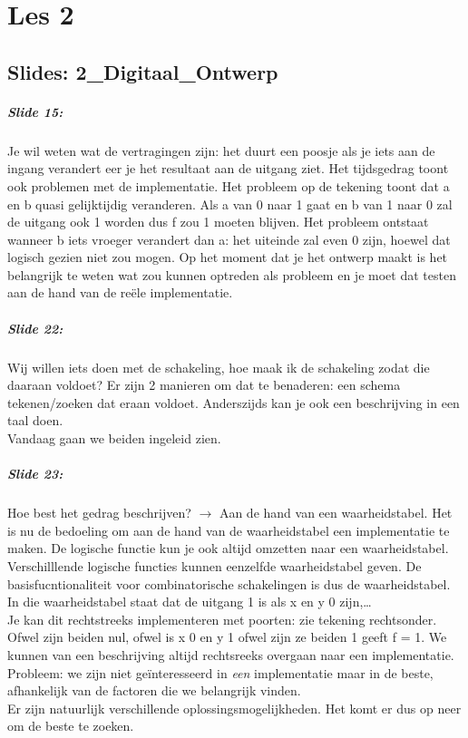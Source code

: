 \documentclass[10pt,a4paper]{book}
\begin{document}
\chapter{Les 2}
\section{Slides: 2\_Digitaal\_Ontwerp}

\paragraph{Slide 15:} Je wil weten wat de vertragingen zijn: het duurt een poosje als je iets aan de ingang verandert eer je het resultaat aan de uitgang ziet. Het tijdsgedrag toont ook problemen met de implementatie. Het probleem op de tekening toont dat a en b quasi gelijktijdig veranderen. Als a van 0 naar 1 gaat en b van 1 naar 0 zal de uitgang ook 1 worden dus f zou 1 moeten blijven. Het probleem ontstaat wanneer b iets vroeger verandert dan a: het uiteinde zal even 0 zijn, hoewel dat logisch gezien niet zou mogen. Op het moment dat je het ontwerp maakt is het belangrijk te weten wat zou kunnen optreden als probleem en je moet dat testen aan de hand van de re\"ele implementatie.

\paragraph{Slide 22:} Wij willen iets doen met de schakeling, hoe maak ik de schakeling zodat die daaraan voldoet? Er zijn 2 manieren om dat te benaderen: een schema tekenen/zoeken dat eraan voldoet. Anderszijds kan je ook een beschrijving in een taal doen.\\
Vandaag gaan we beiden ingeleid zien.

\paragraph{Slide 23:} Hoe best het gedrag beschrijven? $\rightarrow$ Aan de hand van een waarheidstabel. Het is nu de bedoeling om aan de hand van de waarheidstabel een implementatie te maken. De logische functie kun je ook altijd omzetten naar een waarheidstabel. Verschilllende logische functies kunnen eenzelfde waarheidstabel geven. De basisfucntionaliteit voor combinatorische schakelingen is dus de waarheidstabel.\\
In die waarheidstabel staat dat de uitgang 1 is als x en y 0 zijn,… \\
Je kan dit rechtstreeks implementeren met poorten: zie tekening rechtsonder.\\
Ofwel zijn beiden nul, ofwel is x 0 en y 1 ofwel zijn ze beiden 1 geeft f = 1. We kunnen van een beschrijving altijd rechtsreeks overgaan naar een implementatie. Probleem: we zijn niet ge\"interesseerd in \emph{een} implementatie maar in de beste, afhankelijk van de factoren die we belangrijk vinden. \\
Er zijn natuurlijk verschillende oplossingsmogelijkheden. Het komt er dus op neer om de beste te zoeken.
\end{document}
